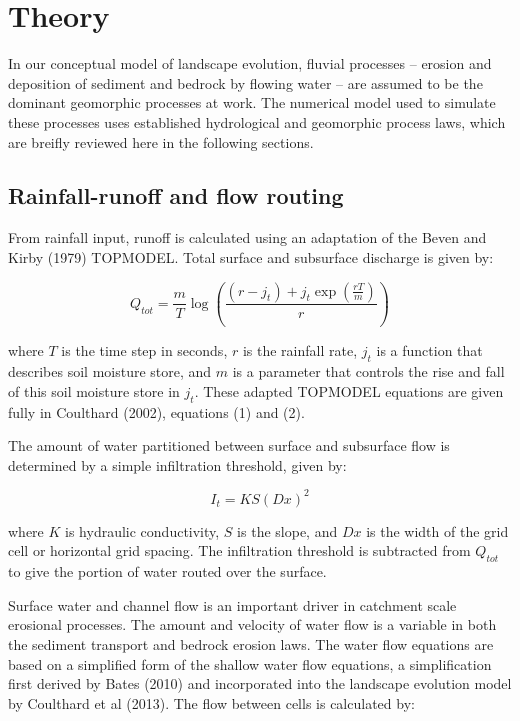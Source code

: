 \documentclass[12pt,oneside,PhD]{muthesis}
\begin{document}
\section{Theory}
In our conceptual model of landscape evolution, fluvial processes -- erosion and deposition of sediment and bedrock by flowing water -- are assumed to be the dominant geomorphic processes at work. The numerical model used to simulate these processes uses established hydrological and geomorphic process laws, which are breifly reviewed here in the following sections.

\subsection{Rainfall-runoff and flow routing}
From rainfall input, runoff is calculated using an adaptation of the Beven and Kirby (1979) TOPMODEL. Total surface and subsurface discharge is given by:

\begin{equation}
Q_{tot} = \frac{m}{T}\log \left( \frac{(r - j_t) + j_t \exp \left( \frac{rT}{m} \right) }{r} \right)
\end{equation}

where \(T\) is the time step in seconds, \(r\) is the rainfall rate, \(j_t\) is a function that describes soil moisture store, and \(m\) is a parameter that controls the rise and fall of this soil moisture store in \(j_t\). These adapted TOPMODEL equations are given fully in Coulthard (2002), equations (1) and (2).

The amount of water partitioned between surface and subsurface flow is determined by a simple infiltration threshold, given by:

\begin{equation}
I_t = KS(Dx)^2
\end{equation}

where \(K\) is hydraulic conductivity, \(S\) is the slope, and \(Dx\) is the width of the grid cell or horizontal grid spacing. The infiltration threshold is subtracted from \(Q_{tot}\) to give the portion of water routed over the surface.

Surface water and channel flow is an important driver in catchment scale erosional processes. The amount and velocity of water flow is a variable in both the sediment transport and bedrock erosion laws. The water flow equations are based on a simplified form of the shallow water flow equations, a simplification first derived by Bates (2010) and incorporated into the landscape evolution model by Coulthard et al (2013). The flow between cells is calculated by:
\end{document}
